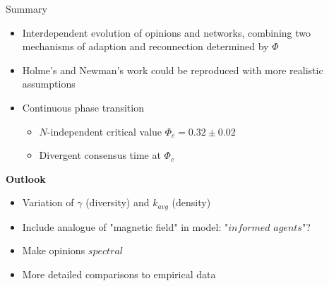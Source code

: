 \documentclass[xcolor=x11names,compress]{beamer}
\renewcommand{\(}{\begin{columns}}
\renewcommand{\)}{\end{columns}}
\newcommand{\<}[1]{\begin{column}{#1}}
\renewcommand{\>}{\end{column}}
\begin{document}
\begin{frame}{Summary}

\begin{itemize}
\item Interdependent evolution of opinions and networks, combining two mechanisms of adaption and reconnection determined by $\Phi$
\item Holme's and Newman's \cite{main paper} work could be reproduced with more realistic assumptions %
\item Continuous phase transition
\begin{itemize}
\item $N$-independent critical value $\Phi_c = 0.32 \pm 0.02$
\item Divergent consensus time at $\Phi_c$
\end{itemize}
\end{itemize}

\textbf{Outlook}
\begin{itemize}
\item Variation of $\gamma$ (diversity) and $k_{avg}$ (density)
\item Include analogue of "magnetic field" in model: "$informed$ $ agents$"?
\item Make opinions $spectral$
\item More detailed comparisons to empirical data
\end{itemize}

\end{frame}

\end{document}
